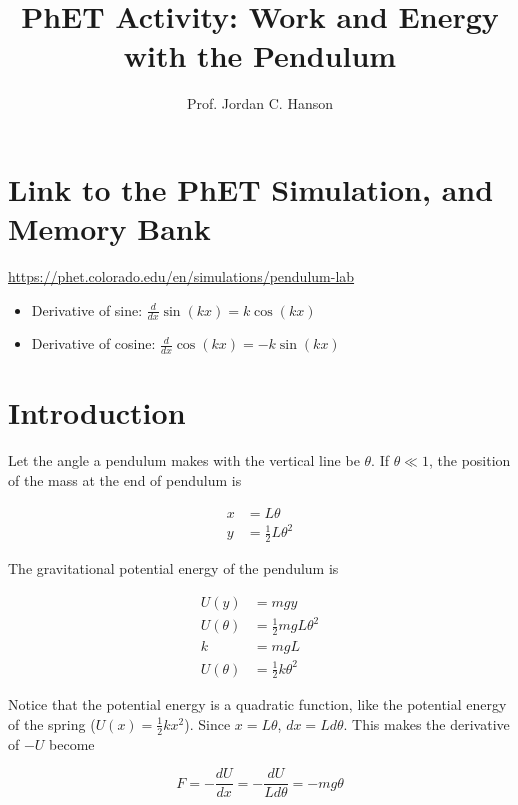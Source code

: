\documentclass{article}
\begin{document}
\title{PhET Activity: Work and Energy with the Pendulum}
\author{Prof. Jordan C. Hanson}

\maketitle

\section{Link to the PhET Simulation, and Memory Bank}

\url{https://phet.colorado.edu/en/simulations/pendulum-lab}

\begin{itemize}
\item Derivative of sine: $\frac{d}{dx} \sin(kx) = k\cos(kx)$
\item Derivative of cosine: $\frac{d}{dx} \cos(kx) = -k\sin(kx)$
\end{itemize}

\section{Introduction}

Let the angle a pendulum makes with the vertical line be $\theta$.  If $\theta \ll 1$, the position of the mass at the end of pendulum is

\begin{align}
x &= L\theta \\
y &= \frac{1}{2}L\theta^2
\end{align}

The gravitational potential energy of the pendulum is 

\begin{align}
U(y) &= mgy \\
U(\theta) &= \frac{1}{2}mgL\theta^2 \\
k &= mgL \\
U(\theta) &= \frac{1}{2}k\theta^2
\end{align}

Notice that the potential energy is a quadratic function, like the potential energy of the spring ($U(x) = \frac{1}{2} k x^2$).  Since $x = L\theta$, $dx = Ld\theta$.  This makes the derivative of $-U$ become

\begin{equation}
F = -\frac{dU}{dx} = -\frac{dU}{Ld\theta} = -mg\theta
\end{equation}
\end{document}
